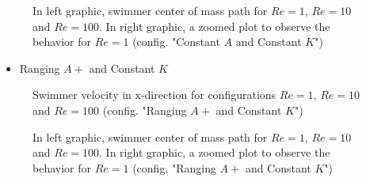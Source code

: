 \begin{figure}[H]
\centering
\begin{subfigure}
\centering
  \begin{footnotesize}
  
  \end{footnotesize}
\end{subfigure}
\begin{subfigure}%
  \centering
  \begin{footnotesize}
  
  \end{footnotesize}
\end{subfigure}
   \caption[In left graphic, swimmer center of mass path for $Re=1$, $Re=10$ and $Re=100$. In right graphic, a zoomed plot to observe the behavior for $Re=1$ (config. "Constant $A$ and Constant $K$")]{In left graphic, swimmer center of mass path for $Re=1$, $Re=10$ and $Re=100$. In right graphic, a zoomed plot to observe the behavior for $Re=1$ (config. "Constant $A$ and Constant $K$") }
   \label{fig:Bild4.25}
\end{figure}






\begin{itemize}
  \item Ranging $A+$ and Constant $K$
\end{itemize}





\begin{figure}[H]
\centering
  \begin{footnotesize}
  
  \caption[Swimmer velocity in x-direction for configurations $Re=1$, $Re=10$ and $Re=100$ (config. "Ranging $A+$ and Constant $K$")]{Swimmer velocity in x-direction for configurations $Re=1$, $Re=10$ and $Re=100$ (config. "Ranging $A+$ and Constant $K$")}
   \label{fig:Bild4.26}
  \end{footnotesize}
\end{figure}



\begin{figure}[H]
\centering
\begin{subfigure}
\centering
  \begin{footnotesize}
  
  \end{footnotesize}
\end{subfigure}
\begin{subfigure}%
  \centering
  \begin{footnotesize}
  
  \end{footnotesize}
\end{subfigure}
   \caption[In left graphic, swimmer center of mass path for $Re=1$, $Re=10$ and $Re=100$. In right graphic, a zoomed plot to observe the behavior for $Re=1$ (config. "Ranging $A+$ and Constant $K$")]{In left graphic, swimmer center of mass path for $Re=1$, $Re=10$ and $Re=100$. In right graphic, a zoomed plot to observe the behavior for $Re=1$ (config. "Ranging $A+$ and Constant $K$")}
   \label{fig:Bild4.27}
\end{figure}



